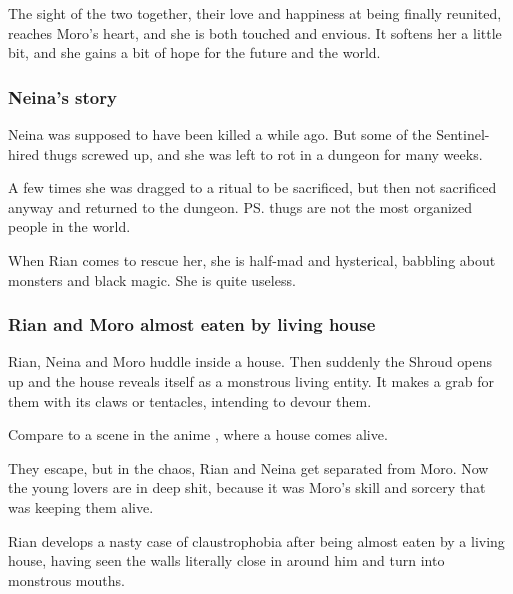 \begin{garbage}
The sight of the two together, their love and happiness at being finally reunited, reaches Moro's heart, and she is both touched and envious. It softens her a little bit, and she gains a bit of hope for the future and the world.





\subsubsection{Neina's story}
Neina was supposed to have been killed a while ago. But some of the Sentinel-hired thugs screwed up, and she was left to rot in a dungeon for many weeks. 

A few times she was dragged to a ritual to be sacrificed, but then not sacrificed anyway and returned to the dungeon. 
\ps{\Psyrex}{} thugs are not the most organized people in the world. 

When Rian comes to rescue her, she is half-mad and hysterical, babbling about monsters and black magic. She is quite useless. 





\subsubsection{Rian and Moro almost eaten by living house}
Rian, Neina and Moro huddle inside a house. Then suddenly the Shroud opens up and the house reveals itself as a monstrous living entity. It makes a grab for them with its claws or tentacles, intending to devour them. 

Compare to a scene in the anime \cite[episode 1]{Anime:IczerOne}, where a house comes alive.

They escape, but in the chaos, Rian and Neina get separated from Moro. Now the young lovers are in deep shit, because it was Moro's skill and sorcery that was keeping them alive.

Rian develops a nasty case of claustrophobia after being almost eaten by a living house, having seen the walls literally close in around him and turn into monstrous mouths. 
















\end{garbage}
